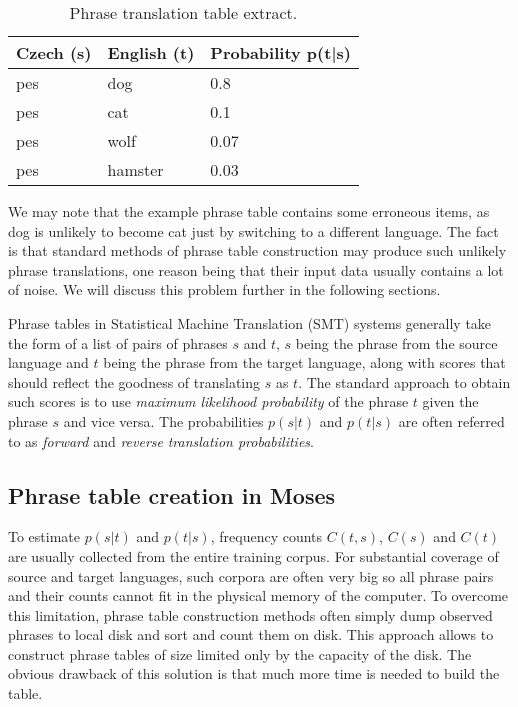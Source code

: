 \begin{table}[h]
\centering
\begin{tabular}{ l l l}
Czech (s) & English (t) & Probability p(t|s) \\
\hline
\hline
pes & dog & 0.8 \\
pes & cat & 0.1 \\
pes & wolf & 0.07 \\
pes & hamster & 0.03 \\
\hline
\hline
\end{tabular}
\caption{\label{phrase-table-example}Phrase translation table extract.}
\end{table}

We may note that the example phrase table contains some erroneous items,
as dog is unlikely to become cat just by switching to a different language.
The fact is that standard methods of phrase table construction may produce such
unlikely phrase translations, one reason being that their input data usually
contains a lot of noise.
We will discuss this problem further in the following sections.


Phrase tables in Statistical Machine Translation (SMT) systems generally take
the form of a list of pairs of phrases $s$ and $t$, $s$ being the phrase from
the source language and $t$ being the phrase from the target language, along
with scores that should reflect the goodness of translating $s$ as $t$.
The standard approach to obtain such scores is to use \emph{maximum likelihood
probability} of the phrase $t$ given the phrase $s$ and vice versa.
The probabilities $p(s|t)$ and $p(t|s)$ are often referred to as
\emph{forward} and \emph{reverse} \emph{translation probabilities}.


\subsection{Phrase table creation in Moses}


To estimate $p(s|t)$ and $p(t|s)$, frequency counts $C(t,s)$, $C(s)$ and
$C(t)$ are usually collected from the entire training corpus.
For substantial coverage of source and target languages, such corpora are
often very big so all phrase pairs and their counts cannot fit in the
physical memory of the computer.
To overcome this limitation, phrase table construction methods often simply
dump observed phrases to local disk and sort and count them on disk.
This approach allows to construct phrase tables of size limited only by the
capacity of the disk.
The obvious drawback of this solution is that much more time is needed
to build the table.


